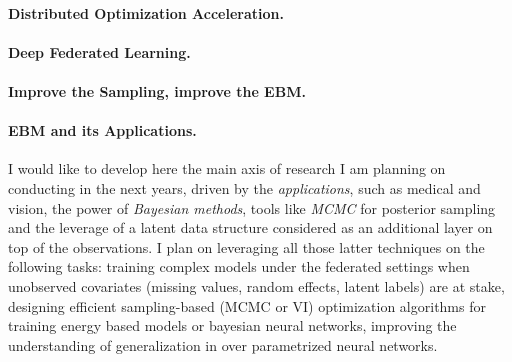 \documentclass[twoside,11pt]{article}
\begin{document}
\clearpage
\vspace{0.2in}
\textbf{}
\vspace{0.2in}


\vspace{0.08in}
\paragraph{Distributed Optimization Acceleration.} 


\vspace{0.08in}
\paragraph{Deep Federated Learning.} 



\clearpage
\vspace{0.2in}
\textbf{}
\vspace{0.2in}



\vspace{0.08in}
\paragraph{Improve the Sampling, improve the EBM.} 


\vspace{0.08in}
\paragraph{EBM and its Applications.} 



\clearpage
\vspace{0.25in}
\textbf{} 
\vspace{0.15in}

I would like to develop here the main axis of research I am planning on conducting in the next years, driven by the \emph{applications}, such as medical and vision, the power of \emph{Bayesian methods}, tools like \emph{MCMC} for posterior sampling and the leverage of a latent data structure considered as an additional layer on top of the observations. 
I plan on leveraging all those latter techniques on the following tasks: training complex models under the federated settings when unobserved covariates (missing values, random effects, latent labels) are at stake, designing efficient sampling-based (MCMC or VI) optimization algorithms for training energy based models or bayesian neural networks, improving the understanding of generalization in over parametrized neural networks.
\end{document}
